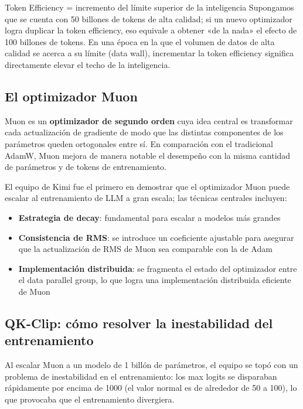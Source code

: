 \documentclass[a4paper]{article}
\begin{document}
\begin{importantbox}{Token Efficiency = incremento del límite superior de la inteligencia}
Supongamos que se cuenta con 50 billones de tokens de alta calidad; si un nuevo optimizador logra duplicar la token efficiency, eso equivale a obtener «de la nada» el efecto de 100 billones de tokens. En una época en la que el volumen de datos de alta calidad se acerca a su límite (data wall), incrementar la token efficiency significa directamente elevar el techo de la inteligencia.
\end{importantbox}

\subsection{El optimizador Muon}

Muon es un \textbf{optimizador de segundo orden} cuya idea central es transformar cada actualización de gradiente de modo que las distintas componentes de los parámetros queden ortogonales entre sí. En comparación con el tradicional AdamW, Muon mejora de manera notable el desempeño con la misma cantidad de parámetros y de tokens de entrenamiento.

El equipo de Kimi fue el primero en demostrar que el optimizador Muon puede escalar al entrenamiento de LLM a gran escala; las técnicas centrales incluyen:
\begin{itemize}
    \item \textbf{Estrategia de decay}: fundamental para escalar a modelos más grandes
    \item \textbf{Consistencia de RMS}: se introduce un coeficiente ajustable para asegurar que la actualización de RMS de Muon sea comparable con la de Adam
    \item \textbf{Implementación distribuida}: se fragmenta el estado del optimizador entre el data parallel group, lo que logra una implementación distribuida eficiente de Muon
\end{itemize}

\subsection{QK-Clip: cómo resolver la inestabilidad del entrenamiento}

Al escalar Muon a un modelo de 1 billón de parámetros, el equipo se topó con un problema de inestabilidad en el entrenamiento: los max logits se disparaban rápidamente por encima de 1000 (el valor normal es de alrededor de 50 a 100), lo que provocaba que el entrenamiento divergiera.
\end{document}
